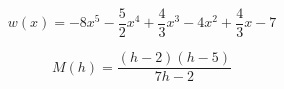 \documentclass{ximera}
\begin{document}
\begin{example}
\begin{question}


\[
w(x) = -8x^5 - \frac{5}{2} x^4 + \frac{4}{3} x^3 - 4x^2 + \frac{4}{3} x - 7
\]

\begin{multipleChoice}
\end{multipleChoice}


\end{question}











\begin{question}


\[
M(h) = \frac{(h-2)(h-5)}{7h - 2}
\]

\begin{multipleChoice}
\end{multipleChoice}


\end{question}











\end{example}
\end{document}
